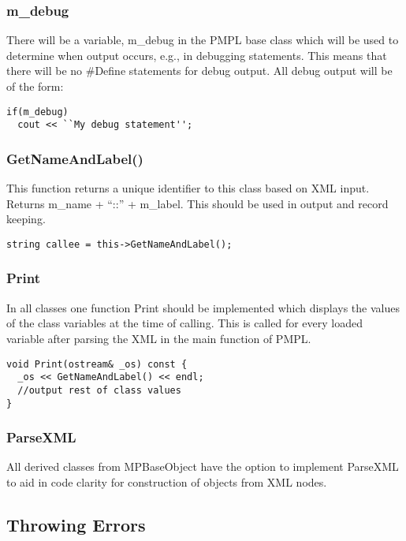 \documentclass[12pt]{article}
\begin{document}
\subsubsection{m\_debug}

There will be a variable, m\_debug in the PMPL base class which will be used to
determine when output occurs, e.g., in debugging statements. This means that
there will be no \#Define statements for debug output. All debug output will be
of the form:

\begin{lstlisting}
if(m_debug)
  cout << ``My debug statement'';
\end{lstlisting}

\subsubsection{GetNameAndLabel()}

This function returns a unique identifier to this class based on XML input.
Returns m\_name + ``::'' + m\_label. This should be used in output and record
keeping.

\begin{lstlisting}
string callee = this->GetNameAndLabel();
\end{lstlisting}

\subsubsection{Print}

In all classes one function Print should be implemented which displays the
values of the class variables at the time of calling. This is called for every
loaded variable after parsing the XML in the main function of PMPL.

\begin{lstlisting}
void Print(ostream& _os) const {
  _os << GetNameAndLabel() << endl;
  //output rest of class values
}
\end{lstlisting}

\subsubsection{ParseXML}

All derived classes from MPBaseObject have the option to implement ParseXML to
aid in code clarity for construction of objects from XML nodes.

\subsection{Throwing Errors}
\end{document}
